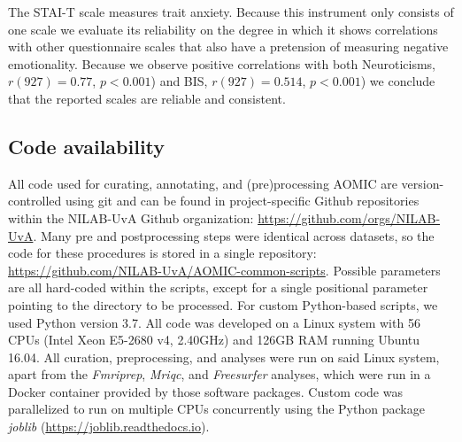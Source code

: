 \documentclass[12pt,american,a4paper,oneside,]{memoir} %
\begin{document}
The STAI-T scale measures trait anxiety. Because this instrument only consists of one scale we evaluate its reliability on the degree in which it shows correlations with other questionnaire scales that also have a pretension of measuring negative emotionality. Because we observe positive correlations with both Neuroticisms, \(r(927) = 0.77\), \(p < 0.001\)) and BIS, \(r(927) = 0.514\), \(p < 0.001\)) we conclude that the reported scales are reliable and consistent.

\hypertarget{aomic-code-availability}{%
\subsection{Code availability}\label{aomic-code-availability}}

All code used for curating, annotating, and (pre)processing AOMIC are version-controlled using git and can be found in project-specific Github repositories within the NILAB-UvA Github organization: \url{https://github.com/orgs/NILAB-UvA}. Many pre and postprocessing steps were identical across datasets, so the code for these procedures is stored in a single repository: \url{https://github.com/NILAB-UvA/AOMIC-common-scripts}. Possible parameters are all hard-coded within the scripts, except for a single positional parameter pointing to the directory to be processed. For custom Python-based scripts, we used Python version 3.7. All code was developed on a Linux system with 56 CPUs (Intel Xeon E5-2680 v4, 2.40GHz) and 126GB RAM running Ubuntu 16.04. All curation, preprocessing, and analyses were run on said Linux system, apart from the \emph{Fmriprep}, \emph{Mriqc}, and \emph{Freesurfer} analyses, which were run in a Docker container provided by those software packages. Custom code was parallelized to run on multiple CPUs concurrently using the Python package \emph{joblib} (\url{https://joblib.readthedocs.io}).
\end{document}
